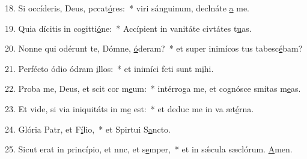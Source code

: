 18. Si occíderis, Deus, pccat\uline{ó}res:~* viri sánguinum, declnáte \uline{a} me.\par 
19. Quia dícitis in cogitti\uline{ó}ne:~* Accípient in vanitáte civtátes t\uline{u}as.\par 
20. Nonne qui odérunt te, Dómne, \uline{ó}deram?~* et super inimícos tus tabesc\uline{é}bam?\par 
21. Perfécto ódio ódram \uline{i}llos:~* et inimíci fcti sunt m\uline{i}hi.\par 
22. Proba me, Deus, et scit cor m\uline{e}um:~* intérroga me, et cognósce smitas m\uline{e}as.\par 
23. Et vide, si via iniquitáts in m\uline{e} est:~* et deduc me in va æt\uline{é}rna.\par 
24. Glória Patr, et F\uline{í}lio,~* et Spirtui S\uline{a}ncto.\par 
25. Sicut erat in princípio, et nnc, et s\uline{e}mper,~* et in sǽcula sæclórum. \uline{A}men.\par 
